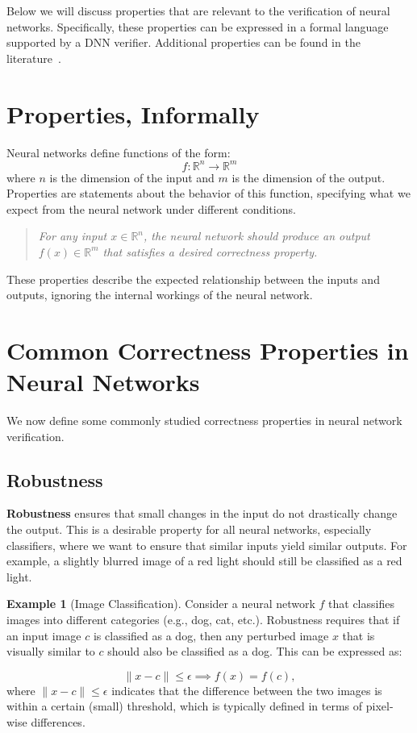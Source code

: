 \documentclass[oneside,11pt,dvipsnames]{book}
\numberwithin{equation}{section}
\theoremstyle{definition}
\newtheorem{example}{Example}[section]
\theoremstyle{remark}
\begin{document}
Below we will discuss properties that are relevant to the verification of neural networks. Specifically, these properties can be 
expressed in a formal language supported by a DNN verifier. Additional properties can be found in the literature~\cite{seshia2018formal}.

\section{Properties, Informally}

Neural networks define functions of the form:
\[
f: \mathbb{R}^{n} \to \mathbb{R}^{m}
\]
where $n$ is the dimension of the input and $m$ is the dimension of the output. Properties are statements about the behavior of this function, specifying what we expect from the neural network under different conditions.

\begin{quote}
\textit{For any input $x \in \mathbb{R}^{n}$, the neural network should produce an output $f(x) \in \mathbb{R}^{m}$ that satisfies a desired correctness property.}
\end{quote}

These properties describe the expected relationship between the inputs and outputs, ignoring the internal workings of the neural network.

\section{Common Correctness Properties in Neural Networks}

We now define some commonly studied correctness properties in neural network verification.

\subsection{Robustness}

\textbf{Robustness} ensures that small changes in the input do not drastically change the output. This is a desirable property for all neural networks, especially classifiers, where we want to ensure that similar inputs yield similar outputs. For example, a slightly blurred image of a red light should still be classified as a red light.

\begin{example}[Image Classification]
Consider a neural network $f$ that classifies images into different categories (e.g., dog, cat, etc.). Robustness requires that if an input image $c$ is classified as a dog, then any perturbed image $x$ that is visually similar to $c$ should also be classified as a dog. This can be expressed as:

\[
\|x - c\| \leq \epsilon \implies f(x) = f(c), 
\]
where $\|x - c\| \leq \epsilon$ indicates that the difference between the two images is within a certain (small) threshold, which is typically defined in terms of pixel-wise differences.
\end{example}
\end{document}
